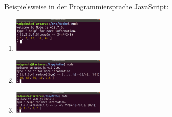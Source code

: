 \item Beispielsweise in der Programmiersprache JavaScript:
\begin{enumerate}
\item 
\includegraphics[width=0.35\textwidth]{../tex-snippets/ex-sequence-1-img-a.png}
\item
\includegraphics[width=0.35\textwidth]{../tex-snippets/ex-sequence-1-img-b.png}
\item 
\includegraphics[width=0.35\textwidth]{../tex-snippets/ex-sequence-1-img-c.png}
\end{enumerate}

